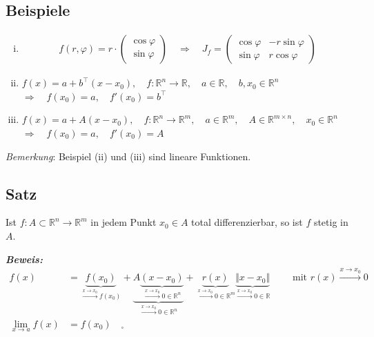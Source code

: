 \documentclass[11pt,a4paper]{book}
\newcommand {\R}	{\mathbb{R}}
\newcommand {\Rn}	{\mathbb{R}^n}
\newcommand {\Rm}	{\mathbb{R}^m}
\newcommand {\Rmxn}	{\mathbb{R}^{m \times n}}
\newcommand{\1}    	{\mathbbm{1}}
\newcommand{\mitt}	{\textrm{ mit }}
\newcommand{\Beweis}[1][Beweis]
{\begin{mdframed}[backgroundcolor=gray!10,linewidth=0pt]\noindent\textit{\textbf{{#1}:}}~}
\newcommand{\QED}	{\end{mdframed}}
\begin{document}
\subsection{Beispiele}
\begin{enumerate}[(i)]
	\item \begin{align*}
		f(r,\varphi) = r \cdot \left( \begin{array}{c} \cos \varphi \\ \sin \varphi \end{array} \right) \quad \Rightarrow \quad J_f = \left( \begin{array}{cc}
			\cos \varphi & -r \sin \varphi \\
			\sin \varphi & r \cos \varphi
		\end{array} \right)
	\end{align*}
	\item \(f(x) = a + b^\top(x - x_0), \quad f : \Rn \rightarrow \R, \quad a \in \R, \quad b,x_0 \in \Rn\) \\
	\(\Rightarrow \quad f(x_0) = a, \quad f'(x_0) = b^\top \)
	\item \(f(x) = a + A(x - x_0), \quad f : \Rn \rightarrow \Rm, \quad a \in \Rm, \quad A \in \Rmxn, \quad x_0 \in \Rn\) \\
	\(\Rightarrow \quad f(x_0) = a, \quad f'(x_0) = A \)
\end{enumerate}
\textit{Bemerkung}: Beispiel (ii) und (iii) sind lineare Funktionen.

\subsection{Satz}
Ist \(f : A \subset \Rn \rightarrow \Rm\) in jedem Punkt \(x_0 \in A\) total differenzierbar, so ist \(f\) stetig in \(A\). \\

\Beweis
\begin{align*}
	f(x) &= \underbrace{f(x_0)}_{\stackrel{x \rightarrow x_0}{\rightarrow} f(x_0)} + 
	\underbrace{A \underbrace{(x-x_0)}_{\stackrel{x \rightarrow x_0}{\rightarrow} 0 \in \Rn}}_{\stackrel{x \rightarrow x_0}{\rightarrow} 0 \in \Rn} + 
	\underbrace{r(x)}_{\stackrel{x \rightarrow x_0}{\rightarrow} 0 \in \Rm} 
	\underbrace{\Vert x - x_0 \Vert}_{\stackrel{x \rightarrow x_0}{\rightarrow} 0 \in \R}
	\qquad \mitt r(x) \stackrel{x \rightarrow x_0}{\rightarrow} 0 \\
	\lim_{x \rightarrow a} f(x) &= f(x_0) \quad _\square\\
\end{align*}
\QED
\end{document}
